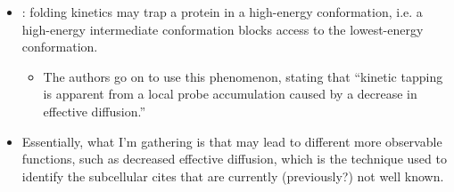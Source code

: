\documentclass[basic,plain]{inVerba-notes}
\begin{document}
\begin{itemize}
\begin{itemize}
        \item {}: folding kinetics may trap a protein in a high-energy conformation, i.e. a high-energy intermediate conformation blocks access to the lowest-energy conformation. 
          \begin{itemize}
            \item The authors go on to use this phenomenon, stating that ``kinetic tapping is apparent from a local probe accumulation caused by a decrease in effective diffusion.''
          \end{itemize}
        \item Essentially, what I'm gathering is that  may lead to different more observable functions, such as decreased effective diffusion, which is the technique used to identify the subcellular cites that are currently (previously?) not well known.
      \end{itemize}
\end{itemize}
\end{document}
